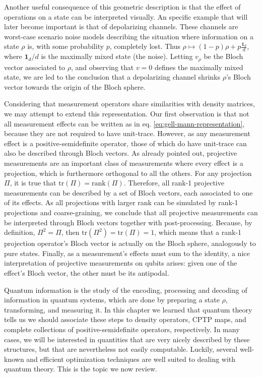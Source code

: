 		Another useful consequence of this geometric description is that the effect of operations on a state can be interpreted visually. An specific example that will later become important is that of depolarizing channels. These channels are worst-case scenario noise models describing the situation where information on a state $\rho$ is, with some probability $p$, completely lost. Thus $\rho \mapsto (1 - p) \rho + p \frac{\mathbf{1}_d}{d}$, where $\mathbf{1}_d/d$ is the maximally mixed state (the noise). Letting $v_\rho$ be the Bloch vector associated to $\rho$, and observing that $v = 0$ defines the maximally mixed state, we are led to the conclusion that a depolarizing channel shrinks $\rho$'s Bloch vector towards the origin of the Bloch sphere.

		Considering that measurement operators share similarities with density matrices, we may attempt to extend this representation. Our first observation is that not all measurement effects can be written as in eq. \ref{eq:gell-mann-representation}, because they are not required to have unit-trace. However, as any measurement effect is a positive-semidefinite operator, those of which do have unit-trace can also be described through Bloch vectors. As already pointed out, projective measurements are an important class of measurements where every effect is a projection, which is furthermore orthogonal to all the others. For any projection $\Pi$, it is true that $\text{tr}(\Pi) = \text{rank}(\Pi)$. Therefore, all rank-1 projective measurements can be described by a set of Bloch vectors, each associated to one of its effects. As all projections with larger rank can be simulated by rank-1 projections and coarse-graining, we conclude that all projective measurements can be interpreted through Bloch vectors together with post-processing. Because, by definition, $\Pi^2 = \Pi$, then $\text{tr}(\Pi^2) = \text{tr}(\Pi) = 1$, which means that a rank-1 projection operator's Bloch vector is actually on the Bloch sphere, analogously to pure states. Finally, as a measurement's effects must sum to the identity, a nice interpretation of projective measurements on qubits arises: given one of the effect's Bloch vector, the other must be its antipodal.


		\ornamentbreak
		Quantum information is the study of the encoding, processing and decoding of information in quantum systems, which are done by preparing a state $\rho$, transforming, and measuring it. In this chapter we learned that quantum theory tells us we should associate these steps to density operators, CPTP maps, and complete collections of positive-semidefinite operators, respectively. In many cases, we will be interested in quantities that are very nicely described by these structures, but that are nevertheless not easily computable. Luckily, several well-known and efficient optimization techniques are well suited to dealing with quantum theory. This is the topic we now review.